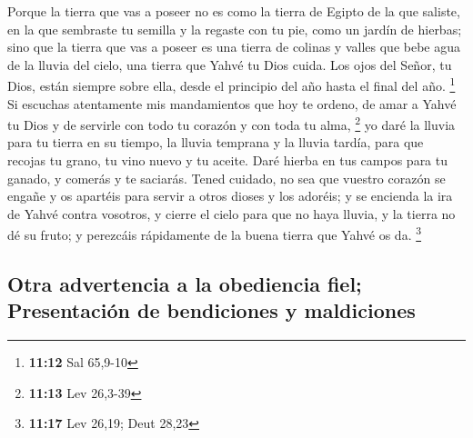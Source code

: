 \begin{paracol}{2}
 Porque la tierra que vas a poseer no es como la tierra
de Egipto de la que saliste, en la que sembraste tu semilla y la regaste
con tu pie, como un jardín de hierbas;  sino que la
tierra que vas a poseer es una tierra de colinas y valles que bebe agua
de la lluvia del cielo,  una tierra que Yahvé tu Dios
cuida. Los ojos del Señor, tu Dios, están siempre sobre ella, desde el
principio del año hasta el final del año. \footnote{\textbf{11:12} Sal
  65,9-10}  Si escuchas atentamente mis mandamientos que
hoy te ordeno, de amar a Yahvé tu Dios y de servirle con todo tu corazón
y con toda tu alma, \footnote{\textbf{11:13} Lev 26,3-39}
 yo daré la lluvia para tu tierra en su tiempo, la lluvia
temprana y la lluvia tardía, para que recojas tu grano, tu vino nuevo y
tu aceite.  Daré hierba en tus campos para tu ganado, y
comerás y te saciarás.  Tened cuidado, no sea que vuestro
corazón se engañe y os apartéis para servir a otros dioses y los
adoréis;  y se encienda la ira de Yahvé contra vosotros,
y cierre el cielo para que no haya lluvia, y la tierra no dé su fruto; y
perezcáis rápidamente de la buena tierra que Yahvé os da. \footnote{\textbf{11:17}
  Lev 26,19; Deut 28,23}

\hypertarget{otra-advertencia-a-la-obediencia-fiel-presentaciuxf3n-de-bendiciones-y-maldiciones}{%
\subsection{Otra advertencia a la obediencia fiel; Presentación de
bendiciones y
maldiciones}\label{otra-advertencia-a-la-obediencia-fiel-presentaciuxf3n-de-bendiciones-y-maldiciones}}


\end{paracol}
